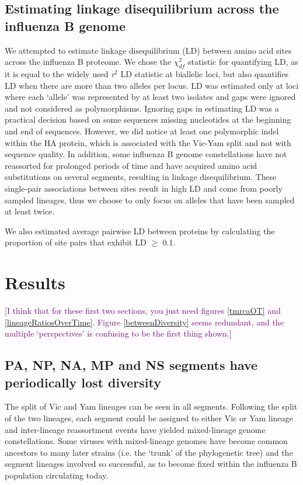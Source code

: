 \documentclass[11pt,oneside,letterpaper]{article}
\def\tbc#1{\textcolor{purple}{[#1]}}
\begin{document}
\subsection*{Estimating linkage disequilibrium across the influenza B genome}
We attempted to estimate linkage disequilibrium (LD) between amino acid sites across the influenza B proteome.
We chose the $\chi^{2}_{df}$ statistic \cite{zhao2005} for quantifying LD, as it is equal to the widely used \textit{r$^{2}$} LD statistic at biallelic loci, but also quantifies LD when there are more than two alleles per locus.
LD was estimated only at loci where each `allele' was represented by at least two isolates and gaps were ignored and not considered as polymorphisms.
Ignoring gaps in estimating LD was a practical decision based on some sequences missing nucleotides at the beginning and end of sequences.
However, we did notice at least one polymorphic indel within the HA protein, which is associated with the Vic-Yam split and not with sequence quality.
In addition, some influenza B genome constellations have not reassorted for prolonged periods of time and have acquired amino acid substitutions on several segments, resulting in linkage disequilibrium.
These single-pair associations between sites result in high LD and come from poorly sampled lineages, thus we choose to only focus on alleles that have been sampled at least twice.

We also estimated average pairwise LD between proteins by calculating the proportion of site pairs that exhibit LD $\geq$ 0.1.

\section*{Results}

\tbc{I think that for these first two sections, you just need figures \ref{tmrcaOT} and \ref{lineageRatiosOverTime}.  Figure \ref{betweenDiversity} seems redundant, and the multiple `perspectives' is confusing to be the first thing shown.}

\subsection*{PA, NP, NA, MP and NS segments have periodically lost diversity}

The split of Vic and Yam lineages can be seen in all segments.
Following the split of the two lineages, each segment could be assigned to either Vic or Yam lineage and inter-lineage reassortment events have yielded mixed-lineage genome constellations.
Some viruses with mixed-lineage genomes have become common ancestors to many later strains (i.e. the `trunk' of the phylogenetic tree) and the segment lineages involved so successful, as to become fixed within the influenza B population circulating today.
\end{document}

